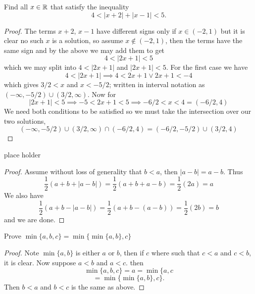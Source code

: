 \question 
Find all $x \in \mathbb{R}$ that satisfy the inequality 
\[ 4 < |x + 2| + |x - 1| < 5. \] 


\begin{proof}
    The terms $x + 2$, $x - 1$ have different signs only if $x \in (-2, 1)$ but it is clear 
    no such $x$ is a solution, so assume $x \notin (-2, 1)$, then the terms have the same sign and by the above we may add them 
    to get 
    \[4 < |2x +1 | < 5\]
    which we may split into $4 < |2x + 1| $ and $|2x + 1| < 5$. 
    For the first case we have 
    \[4 < |2x + 1| \implies 4 < 2x + 1 \vee 2x + 1 < -4\]
    which gives $3/2 < x$ and $x < -5/2$; written in interval notation as $(-\infty, -5/2) \cup (3/2, \infty)$. 
    Now for 
    \[|2x + 1| < 5 \implies -5 < 2x + 1 < 5 \implies -6/2 < x < 4 = (-6/2, 4)\]
    We need both conditions to be satisfied so we must take the intersection over our two solutions, 
    \[(-\infty, -5/2) \cup (3/2, \infty) \cap (-6/2, 4) = (-6/2, -5/2) \cup (3/2, 4)\]
\end{proof}

\question 
place holder 


\begin{alphaparts}
\questionpart

\begin{proof}
    Assume without loss of generality that $b < a$, then $|a - b| = a - b$. 
    Thus 
    \[\frac{1}{2}(a + b + |a - b|) = \frac{1}{2}(a + b + a -b ) = \frac{1}{2}(2a) = a\]
    We also have 
    \[\frac{1}{2}(a + b - |a - b|) = \frac{1}{2}(a + b -(a - b)) = \frac{1}{2}(2b) = b\]
    and we are done.  
\end{proof}

\questionpart 
Prove $\min\{a, b, c\} = \min\{\min\{a, b\}, c\}$

\begin{proof}
    Note $\min\{a, b\}$ is either $a$ or $b$, then if $c$ where such that $c < a$ and $c < b$, it is clear. Now suppose $a < b$ and $a < c$. then 
\[ \min\{a, b, c\} = a = \min\{a, c \] 
\[ = \min\{\min\{a, b\}, c\}.\]
Then $b < a$ and $b < c$ is the same as above.

\end{proof}


\end{alphaparts}


\question 

